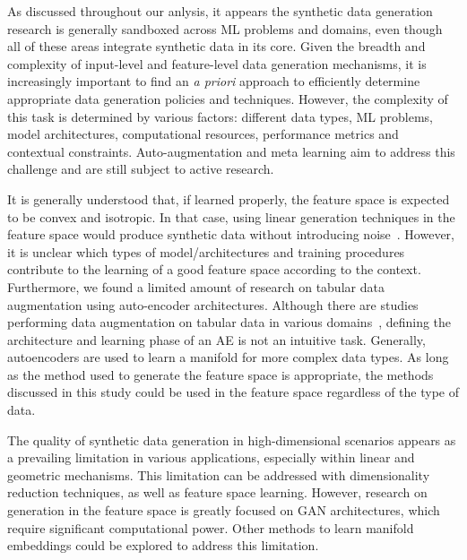 \documentclass[parskip=full]{scrartcl}
\begin{document}
As discussed throughout our anlysis, it appears the synthetic data generation
research is generally sandboxed across ML problems and domains, even though
all of these areas integrate synthetic data in its core. Given the breadth
and complexity of input-level and feature-level data generation mechanisms, it
is increasingly important to find an \textit{a priori} approach to efficiently
determine appropriate data generation policies and techniques. However, the
complexity of this task is determined by various factors: different data
types, ML problems, model architectures, computational resources, performance
metrics and contextual constraints. Auto-augmentation and meta learning aim to
address this challenge and are still subject to active research.

It is generally understood that, if learned properly, the feature space is
expected to be convex and isotropic. In that case, using linear generation
techniques in the feature space would produce synthetic data without
introducing noise~\cite{cheung2020modals}. However, it is unclear which types
of model/architectures and training procedures contribute to the learning of a
good feature space according to the context. Furthermore, we found a limited
amount of research on tabular data augmentation using auto-encoder
architectures. Although there are studies performing data augmentation on
tabular data in various domains~\cite{delgado2021deep}, defining the
architecture and learning phase of an AE is not an intuitive task. Generally,
autoencoders are used to learn a manifold for more complex data types. As long
as the method used to generate the feature space is appropriate, the methods
discussed in this study could be used in the feature space regardless of the
type of data.

The quality of synthetic data generation in high-dimensional scenarios appears
as a prevailing limitation in various applications, especially within linear
and geometric mechanisms. This limitation can be addressed with dimensionality
reduction techniques, as well as feature space learning.  However, research on
generation in the feature space is greatly focused on GAN architectures, which
require significant computational power. Other methods to learn manifold
embeddings could be explored to address this limitation.
\end{document}
